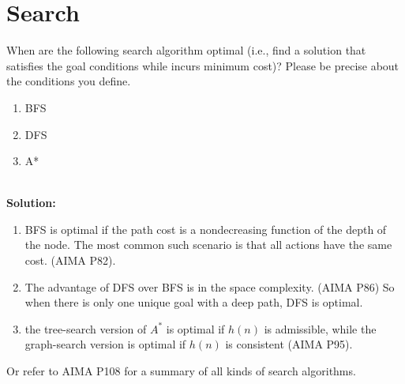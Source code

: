 

\section{Search}

When are the following search algorithm optimal (i.e., find a solution that satisfies the goal conditions while incurs minimum cost)? Please be precise about the conditions you define.
\begin{enumerate}
\item BFS
\item DFS
\item A*
\end{enumerate}

\ \\{\bf Solution:}
\begin{enumerate}
\item BFS is optimal if the path cost is a nondecreasing function of the depth of the node. The most common such scenario is that all actions have the same cost. (AIMA P82). 
\item The advantage of DFS over BFS is in the space complexity. (AIMA P86) So when there is only one unique goal with a deep path, DFS is optimal.
\item  the tree-search version of $A^*$ is optimal if $h(n)$ is admissible, while the graph-search version is optimal if $h(n)$ is consistent (AIMA P95).
\end{enumerate}

Or refer to AIMA P108 for a summary of all kinds of search algorithms.